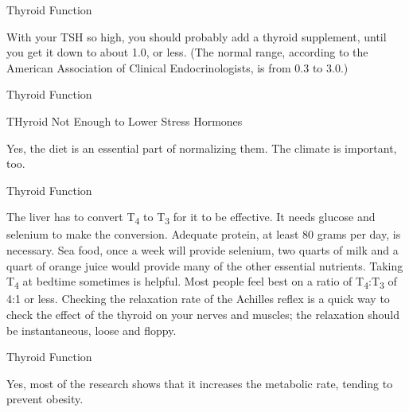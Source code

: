 \documentclass[11pt,oneside,openany,extrafontsizes]{memoir}
\begin{document}
\begin{standalonequote}{Thyroid Function}

    \begin{answer}
        With your TSH so high, you should probably add a thyroid supplement, until you get it down to about 1.0, or less. (The normal range, according to the American Association of Clinical Endocrinologists, is from 0.3 to 3.0.)
    \end{answer}
\end{standalonequote}

\begin{standalonequote}{Thyroid Function}
    \begin{note}
        THyroid Not Enough to Lower Stress Hormones
    \end{note}

    \begin{answer}
        Yes, the diet is an essential part of normalizing them. The climate is important, too.
    \end{answer}
\end{standalonequote}

\begin{standalonequote}{Thyroid Function}

    \begin{answer}
        The liver has to convert T\textsubscript{4} to T\textsubscript{3} for it to be effective. It needs glucose and selenium to make the conversion. Adequate protein, at least 80 grams per day, is necessary. Sea food, once a week will provide selenium, two quarts of milk and a quart of orange juice would provide many of the other essential nutrients. Taking T\textsubscript{4} at bedtime sometimes is helpful. Most people feel best on a ratio of T\textsubscript{4}:T\textsubscript{3} of 4:1 or less. Checking the relaxation rate of the Achilles reflex is a quick way to check the effect of the thyroid on your nerves and muscles; the relaxation should be instantaneous, loose and floppy.
    \end{answer}
\end{standalonequote}

\begin{standalonequote}{Thyroid Function}

    \begin{answer}
        Yes, most of the research shows that it increases the metabolic rate, tending to prevent obesity.
    \end{answer}
\end{standalonequote}
\end{document}
